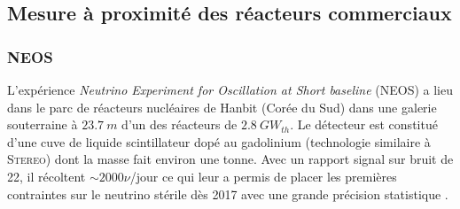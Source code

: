 \bigbreak

\subsection{Mesure à proximité des réacteurs commerciaux}

\subsubsection*{NEOS}

L'expérience \textit{Neutrino Experiment for Oscillation at Short baseline} (NEOS) a lieu dans le parc de réacteurs nucléaires de Hanbit (Corée du Sud) dans une galerie souterraine à $\SI{23.7}{m}$ d'un des réacteurs de $\SI{2.8}{GW_{th}}$. Le détecteur est constitué d'une cuve de liquide scintillateur dopé au gadolinium (technologie similaire à \textsc{Stereo}) dont la masse fait environ une tonne. Avec un rapport signal sur bruit de 22, il récoltent $\sim 2000 \nu$/jour ce qui leur a permis de placer les premières contraintes sur le neutrino stérile dès 2017 avec une grande précision statistique \cite{Ko:2016owz}.\\

